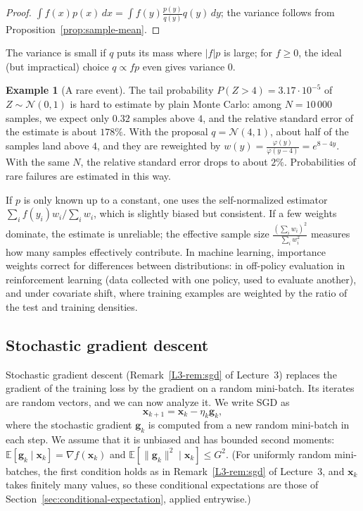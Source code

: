 \documentclass[11pt]{article}
\newcommand{\norm}[1]{\lVert #1 \rVert}
\newcommand{\E}{\mathbb{E}}
\theoremstyle{definition}
\newtheorem{example}[definition]{Example}
\theoremstyle{plain}
\theoremstyle{remark}
\begin{document}
\begin{proof}
    $\int f(x)p(x)\, dx = \int f(y)\frac{p(y)}{q(y)}q(y)\, dy$; the variance follows from Proposition~\ref{prop:sample-mean}.
\end{proof}

The variance is small if $q$ puts its mass where $|f|p$ is large; for $f \geq 0$, the ideal (but impractical) choice $q \propto fp$ even gives variance $0$.

\begin{example}[A rare event]\label{ex:importance}
    The tail probability $P(Z > 4) = 3.17 \cdot 10^{-5}$ of $Z \sim \mathcal{N}(0, 1)$ is hard to estimate by plain Monte Carlo: among $N = 10\,000$ samples, we expect only $0.32$ samples above $4$, and the relative standard error of the estimate is about $178\%$. With the proposal $q = \mathcal{N}(4, 1)$, about half of the samples land above $4$, and they are reweighted by $w(y) = \frac{\varphi(y)}{\varphi(y - 4)} = e^{8 - 4y}$. With the same $N$, the relative standard error drops to about $2\%$. Probabilities of rare failures are estimated in this way.
\end{example}

If $p$ is only known up to a constant, one uses the self-normalized estimator $\sum_i f(y_i)w_i / \sum_i w_i$, which is slightly biased but consistent. If a few weights dominate, the estimate is unreliable; the effective sample size $\frac{(\sum_i w_i)^2}{\sum_i w_i^2}$ measures how many samples effectively contribute. In machine learning, importance weights correct for differences between distributions: in off-policy evaluation in reinforcement learning (data collected with one policy, used to evaluate another), and under covariate shift, where training examples are weighted by the ratio of the test and training densities.

\subsection{Stochastic gradient descent}\label{sec:sgd}

Stochastic gradient descent (Remark~\ref{L3-rem:sgd} of Lecture~3) replaces the gradient of the training loss by the gradient on a random mini-batch. Its iterates are random vectors, and we can now analyze it. We write SGD as
\[\mathbf{x}_{k+1} = \mathbf{x}_k - \eta_k\mathbf{g}_k,\]
where the stochastic gradient $\mathbf{g}_k$ is computed from a new random mini-batch in each step. We assume that it is unbiased and has bounded second moments: $\E[\mathbf{g}_k \mid \mathbf{x}_k] = \nabla f(\mathbf{x}_k)$ and $\E[\norm{\mathbf{g}_k}^2 \mid \mathbf{x}_k] \leq G^2$. (For uniformly random mini-batches, the first condition holds as in Remark~\ref{L3-rem:sgd} of Lecture~3, and $\mathbf{x}_k$ takes finitely many values, so these conditional expectations are those of Section~\ref{sec:conditional-expectation}, applied entrywise.)
\end{document}
